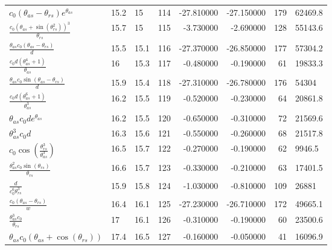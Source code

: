 \begin{tabularx}{\textwidth}{lllrrrrl}
$ c_{0} \left(\theta_{as} - \theta_{rs}\right) e^{\theta_{as}} $  &  15.2  &  15\phantom{.0}  &  114  &  -27.810000  &  -27.150000  &  179  &  62469.8  \\ 
$ \displaystyle\frac{c_{0} \left(\theta_{as} + \sin{\left(\theta_{rs}^{2} \right)}\right)^{3}}{\theta_{rs}} $  &  15.7  &  15\phantom{.0}  &  115  &  -3.730000  &  -2.690000  &  128  &  55143.6  \\ 
$ \displaystyle\frac{\theta_{as} c_{0} \left(\theta_{as} - \theta_{rs}\right)}{d} $  &  15.5  &  15.1  &  116  &  -27.370000  &  -26.850000  &  177  &  57304.2  \\ 
$ \displaystyle\frac{c_{0} d \left(\theta_{as}^{4} + 1\right)}{\theta_{as}} $  &  16\phantom{.0}  &  15.3  &  117  &  -0.480000  &  -0.190000  &  61  &  19833.3  \\ 
$ \displaystyle\frac{\theta_{as} c_{0} \sin{\left(\theta_{as} - \theta_{rs} \right)}}{d} $  &  15.9  &  15.4  &  118  &  -27.310000  &  -26.780000  &  176  &  54304\phantom{.0}  \\ 
$ \displaystyle\frac{c_{0} d \left(\theta_{as}^{6} + 1\right)}{\theta_{as}^{3}} $  &  16.2  &  15.5  &  119  &  -0.520000  &  -0.230000  &  64  &  20861.8  \\ 
$ \theta_{as} c_{0} d e^{\theta_{as}} $  &  16.2  &  15.5  &  120  &  -0.650000  &  -0.310000  &  72  &  21569.6  \\ 
$ \theta_{as}^{3} c_{0} d $  &  16.3  &  15.6  &  121  &  -0.550000  &  -0.260000  &  68  &  21517.8  \\ 
$ c_{0} \cos{\left(\displaystyle\frac{\theta_{rs}^{3}}{\theta_{as}^{3}} \right)} $  &  16.5  &  15.7  &  122  &  -0.270000  &  -0.190000  &  62  &  9946.5  \\ 
$ \displaystyle\frac{\theta_{as}^{2} c_{0} \sin{\left(\theta_{rs} \right)}}{\theta_{rs}} $  &  16.6  &  15.7  &  123  &  -0.330000  &  -0.210000  &  63  &  17401.5  \\ 
$ \displaystyle\frac{d}{c_{0}^{6} \theta_{rs}^{3}} $  &  15.9  &  15.8  &  124  &  -1.030000  &  -0.810000  &  109  &  26881\phantom{.0}  \\ 
$ \displaystyle\frac{c_{0} \left(\theta_{as} - \theta_{rs}\right)}{w} $  &  16.4  &  16.1  &  125  &  -27.230000  &  -26.710000  &  172  &  49665.1  \\ 
$ \displaystyle\frac{\theta_{as}^{3} c_{0}}{\theta_{rs}} $  &  17\phantom{.0}  &  16.1  &  126  &  -0.310000  &  -0.190000  &  60  &  23500.6  \\ 
$ \theta_{as} c_{0} \left(\theta_{as} + \cos{\left(\theta_{rs} \right)}\right) $  &  17.4  &  16.5  &  127  &  -0.160000  &  -0.050000  &  41  &  16096.9  \\ 

\end{tabularx}
